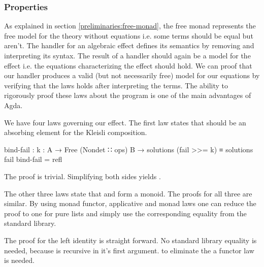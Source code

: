 \subsubsection{Properties}
\label{first-order:nondet:properties}

As explained in section \ref{preliminaries:free-monad}, the free monad
represents the free model for the theory without equations i.e. some terms
should be equal but aren't.
The handler for an algebraic effect defines its semantics by removing and
interpreting its syntax.
The result of a handler should again be a model for the effect i.e. the
equations characterizing the effect should hold.
We can proof that our handler produces a valid (but not necessarily free) model
for our equations by verifying that the laws holds after interpreting the terms.
The ability to rigorously proof these laws about the program is one of the main
advantages of Agda.

We have four laws governing our  effect.
The first law states that \AgdaSpace{}
should be an absorbing element for the Kleisli composition.

\begin{code}[number=fail-annihilating]
bind-fail : {k : A → Free (Nondet ∷ ops) B} → 
  solutions (fail >>= k) ≡ solutions fail
bind-fail = refl
\end{code}
The proof is trivial.
Simplifying both sides yields .

The other three laws state that  and  form a
monoid.
The proofs for all three are similar.
By using monad functor, applicative and monad laws one can reduce the proof to
one for pure lists and simply use the corresponding equality from the standard
library.

The proof for the left identity is straight forward.
No standard library equality is needed, because \AgdaFunction{++} is recursive
in it's first argument.
to eliminate the \AgdaFunction{<\$>} a functor law is needed.

